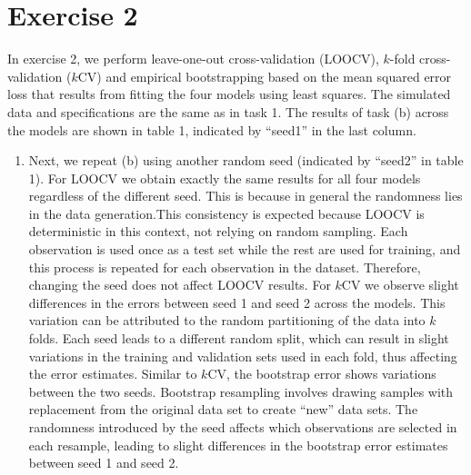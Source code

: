 \documentclass[
]{article}
\providecommand{\tightlist}{%
  \setlength{\itemsep}{0pt}\setlength{\parskip}{0pt}}
\begin{document}
\hypertarget{exercise-2}{%
\section{Exercise 2}\label{exercise-2}}

In exercise 2, we perform leave-one-out cross-validation (LOOCV),
\(k\)-fold cross-validation (\(k\)CV) and empirical bootstrapping based
on the mean squared error loss that results from fitting the four models
using least squares. The simulated data and specifications are the same
as in task 1. The results of task (b) across the models are shown in
table 1, indicated by ``seed1'' in the last column.

\begin{enumerate}
\def\labelenumi{(\alph{enumi})}
\setcounter{enumi}{2}
\tightlist
\item
  Next, we repeat (b) using another random seed (indicated by ``seed2''
  in table 1). For LOOCV we obtain exactly the same results for all four
  models regardless of the different seed. This is because in general
  the randomness lies in the data generation.This consistency is
  expected because LOOCV is deterministic in this context, not relying
  on random sampling. Each observation is used once as a test set while
  the rest are used for training, and this process is repeated for each
  observation in the dataset. Therefore, changing the seed does not
  affect LOOCV results. For \(k\)CV we observe slight differences in the
  errors between seed 1 and seed 2 across the models. This variation can
  be attributed to the random partitioning of the data into \(k\) folds.
  Each seed leads to a different random split, which can result in
  slight variations in the training and validation sets used in each
  fold, thus affecting the error estimates. Similar to \(k\)CV, the
  bootstrap error shows variations between the two seeds. Bootstrap
  resampling involves drawing samples with replacement from the original
  data set to create ``new'' data sets. The randomness introduced by the
  seed affects which observations are selected in each resample, leading
  to slight differences in the bootstrap error estimates between seed 1
  and seed 2.
\end{enumerate}
\end{document}
